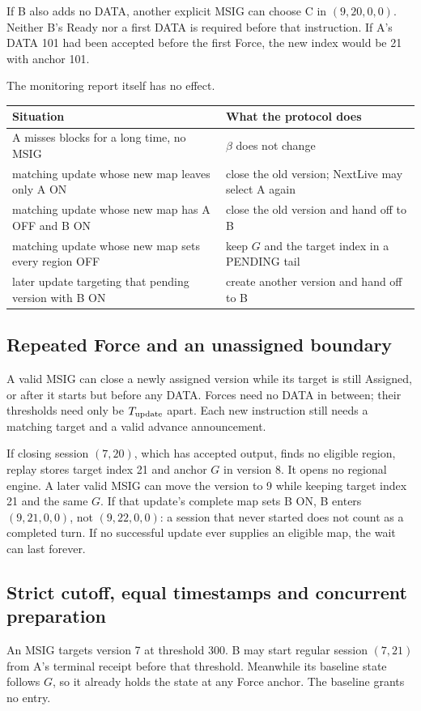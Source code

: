 \documentclass[11pt,a4paper]{article}
\newcounter{protocol}
\begin{document}
If B also adds no DATA, another explicit MSIG can choose C in
$(9,20,0,0)$. Neither B's Ready nor a first DATA is required before that
instruction. If A's DATA 101 had been accepted before the first Force,
the new index would be 21 with anchor 101.

The monitoring report itself has no effect.
\begin{center}\small
\begin{tabularx}{\linewidth}{@{}>{\raggedright\arraybackslash}p{.45\linewidth}Y@{}}\toprule
Situation & What the protocol does\\\midrule
A misses blocks for a long time, no MSIG & $\beta$ does not change\\
matching update whose new map leaves only A ON & close the old version; NextLive may select A again\\
matching update whose new map has A OFF and B ON & close the old version and hand off to B\\
matching update whose new map sets every region OFF & keep $G$ and the target index in a PENDING tail\\
later update targeting that pending version with B ON & create another version and hand off to B\\\bottomrule
\end{tabularx}
\end{center}

\subsection{Repeated Force and an unassigned boundary}
\label{sec:repeated-force}
A valid MSIG can close a newly assigned version while its target is
still Assigned, or after it starts but before any DATA. Forces need no DATA
in between; their thresholds need only be $T_{\rm update}$ apart. Each
new instruction still needs a matching
target and a valid advance announcement.

If closing session $(7,20)$, which has accepted output, finds no eligible
region, replay stores target index 21 and anchor $G$ in version 8. It
opens no regional engine. A later valid MSIG can move the version to 9
while keeping target index 21 and the same $G$. If that update's complete
map sets B ON, B enters $(9,21,0,0)$, not $(9,22,0,0)$: a session that
never started does not count as a completed turn. If no successful update
ever supplies an eligible map, the wait can last forever.

\subsection{Strict cutoff, equal timestamps and concurrent preparation}
\label{sec:cutoff-example}
An MSIG targets version 7 at threshold 300. B may start regular session
$(7,21)$ from A's terminal receipt before that threshold. Meanwhile its
baseline state follows $G$, so it already holds the state at any Force
anchor. The baseline grants no entry.
\end{document}
